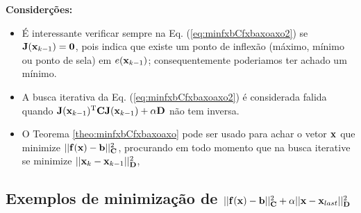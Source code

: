 \begin{theorem}
\textbf{Considerções:}

\begin{itemize}
\item É interessante verificar sempre na Eq. (\ref{eq:minfxbCfxbaxoaxo2}) 
se  $\MATRIX{J}(\VECTOR{x}_{k-1}) = \MATRIX{0}$,
pois indica que existe um ponto de inflexão 
(máximo, mínimo ou ponto de sela) em $e(\VECTOR{x}_{k-1})$;
consequentemente poderiamos ter achado um mínimo.
\item A busca iterativa da Eq. (\ref{eq:minfxbCfxbaxoaxo2}) é considerada falida quando 
$\MATRIX{J}(\VECTOR{x}_{k-1})^{\transpose}\MATRIX{C} \MATRIX{J}(\VECTOR{x}_{k-1}) +\alpha\MATRIX{D}$
não tem inversa.
\end{itemize}


\end{theorem} 


\begin{tcbattention}
\begin{itemize}
\item O Teorema \ref{theo:minfxbCfxbaxoaxo} pode ser usado para achar o vetor $\VECTOR{x}$
que minimize $||\VECTOR{f}(\VECTOR{x})-\VECTOR{b}||_{\MATRIX{C}}^2$, procurando 
em todo momento que na busca iterative se minimize $||\VECTOR{x}_{k}-\VECTOR{x}_{k-1}||_{\MATRIX{D}}^2$,
\end{itemize}
\end{tcbattention}

\subsection{Exemplos de minimização de 
$||\VECTOR{f}(\VECTOR{x})-\VECTOR{b}||_{\MATRIX{C}}^2+\alpha||\VECTOR{x}-\VECTOR{x}_{last}||_{\MATRIX{D}}^2$}


